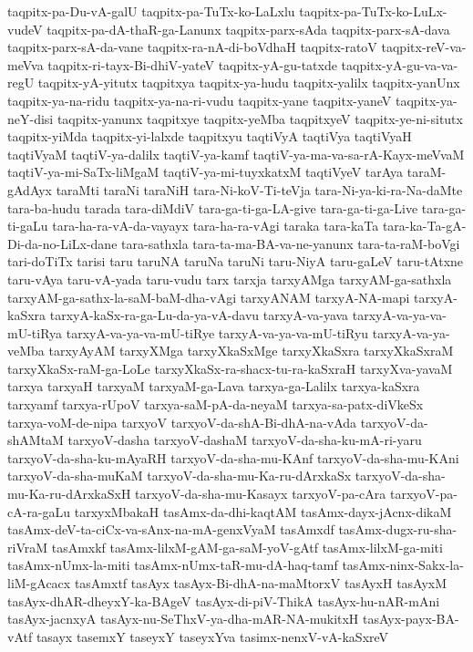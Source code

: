 {taqpitx-pa-Du-vA-galU
taqpitx-pa-TuTx-ko-LaLxlu
taqpitx-pa-TuTx-ko-LuLx-vudeV
taqpitx-pa-dA-thaR-ga-Lanunx
taqpitx-parx-sAda
taqpitx-parx-sA-dava
taqpitx-parx-sA-da-vane
taqpitx-ra-nA-di-boVdhaH
taqpitx-ratoV
taqpitx-reV-va-meVva
taqpitx-ri-tayx-Bi-dhiV-yateV
taqpitx-yA-gu-tatxde
taqpitx-yA-gu-va-va-regU
taqpitx-yA-yitutx
taqpitxya
taqpitx-ya-hudu
taqpitx-yalilx
taqpitx-yanUnx
taqpitx-ya-na-ridu
taqpitx-ya-na-ri-vudu
taqpitx-yane
taqpitx-yaneV
taqpitx-ya-neY-disi
taqpitx-yanunx
taqpitxye
taqpitx-yeMba
taqpitxyeV
taqpitx-ye-ni-situtx
taqpitx-yiMda
taqpitx-yi-lalxde
taqpitxyu
taqtiVyA
taqtiVya
taqtiVyaH
taqtiVyaM
taqtiV-ya-dalilx
taqtiV-ya-kamf
taqtiV-ya-ma-va-sa-rA-Kayx-meVvaM
taqtiV-ya-mi-SaTx-liMgaM
taqtiV-ya-mi-tuyxkatxM
taqtiVyeV
tarAya
taraM-gAdAyx
taraMti
taraNi
taraNiH
tara-Ni-koV-Ti-teVja
tara-Ni-ya-ki-ra-Na-daMte
tara-ba-hudu
tarada
tara-diMdiV
tara-ga-ti-ga-LA-give
tara-ga-ti-ga-Live
tara-ga-ti-gaLu
tara-ha-ra-vA-da-vayayx
tara-ha-ra-vAgi
taraka
tara-kaTa
tara-ka-Ta-gA-Di-da-no-LiLx-dane
tara-sathxla
tara-ta-ma-BA-va-ne-yanunx
tara-ta-raM-boVgi
tari-doTiTx
tarisi
taru
taruNA
taruNa
taruNi
taru-NiyA
taru-gaLeV
taru-tAtxne
taru-vAya
taru-vA-yada
taru-vudu
tarx
tarxja
tarxyAMga
tarxyAM-ga-sathxla
tarxyAM-ga-sathx-la-saM-baM-dha-vAgi
tarxyANAM
tarxyA-NA-mapi
tarxyA-kaSxra
tarxyA-kaSx-ra-ga-Lu-da-ya-vA-davu
tarxyA-va-yava
tarxyA-va-ya-va-mU-tiRya
tarxyA-va-ya-va-mU-tiRye
tarxyA-va-ya-va-mU-tiRyu
tarxyA-va-ya-veMba
tarxyAyAM
tarxyXMga
tarxyXkaSxMge
tarxyXkaSxra
tarxyXkaSxraM
tarxyXkaSx-raM-ga-LoLe
tarxyXkaSx-ra-shacx-tu-ra-kaSxraH
tarxyXva-yavaM
tarxya
tarxyaH
tarxyaM
tarxyaM-ga-Lava
tarxya-ga-Lalilx
tarxya-kaSxra
tarxyamf
tarxya-rUpoV
tarxya-saM-pA-da-neyaM
tarxya-sa-patx-diVkeSx
tarxya-voM-de-nipa
tarxyoV
tarxyoV-da-shA-Bi-dhA-na-vAda
tarxyoV-da-shAMtaM
tarxyoV-dasha
tarxyoV-dashaM
tarxyoV-da-sha-ku-mA-ri-yaru
tarxyoV-da-sha-ku-mAyaRH
tarxyoV-da-sha-mu-KAnf
tarxyoV-da-sha-mu-KAni
tarxyoV-da-sha-muKaM
tarxyoV-da-sha-mu-Ka-ru-dArxkaSx
tarxyoV-da-sha-mu-Ka-ru-dArxkaSxH
tarxyoV-da-sha-mu-Kasayx
tarxyoV-pa-cAra
tarxyoV-pa-cA-ra-gaLu
tarxyxMbakaH
tasAmx-da-dhi-kaqtAM
tasAmx-dayx-jAcnx-dikaM
tasAmx-deV-ta-ciCx-va-sAnx-na-mA-genxVyaM
tasAmxdf
tasAmx-dugx-ru-sha-riVraM
tasAmxkf
tasAmx-lilxM-gAM-ga-saM-yoV-gAtf
tasAmx-lilxM-ga-miti
tasAmx-nUmx-la-miti
tasAmx-nUmx-taR-mu-dA-haq-tamf
tasAmx-ninx-Sakx-la-liM-gAcacx
tasAmxtf
tasAyx
tasAyx-Bi-dhA-na-maMtorxV
tasAyxH
tasAyxM
tasAyx-dhAR-dheyxY-ka-BAgeV
tasAyx-di-piV-ThikA
tasAyx-hu-nAR-mAni
tasAyx-jacnxyA
tasAyx-nu-SeThxV-ya-dha-mAR-NA-mukitxH
tasAyx-payx-BA-vAtf
tasayx
tasemxY
taseyxY
taseyxYva
tasimx-nenxV-vA-kaSxreV
}

